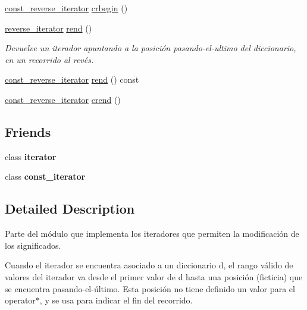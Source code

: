 \begin{Indent}
\begin{DoxyCompactItemize}
\hyperlink{classaed2_1_1iterator_a657402896e5b5966660032f5686cc4c4}{const\+\_\+reverse\+\_\+iterator} \hyperlink{classaed2_1_1iterator_aa4b6ce667258581859351db42cfd3ee4}{crbegin} ()
\item 
\hyperlink{classaed2_1_1iterator_a07b2c0fa31611e03cd019b290acd6d80}{reverse\+\_\+iterator} \hyperlink{classaed2_1_1iterator_a0007a7962bc6aca8dca78c2a49bd581d}{rend} ()
\begin{DoxyCompactList}\small\item\em Devuelve un iterador apuntando a la posición pasando-\/el-\/ultimo del diccionario, en un recorrido al revés. \end{DoxyCompactList}\item 
\hyperlink{classaed2_1_1iterator_a657402896e5b5966660032f5686cc4c4}{const\+\_\+reverse\+\_\+iterator} \hyperlink{classaed2_1_1iterator_ad7d43d936bf4f3957f590723e9029132}{rend} () const
\item 
\hyperlink{classaed2_1_1iterator_a657402896e5b5966660032f5686cc4c4}{const\+\_\+reverse\+\_\+iterator} \hyperlink{classaed2_1_1iterator_a2e31ad7ded06c666c6c37c5d30bb41af}{crend} ()
\end{DoxyCompactItemize}
\end{Indent}
\subsection*{Friends}
\begin{DoxyCompactItemize}
\item 
\mbox{\label{classaed2_1_1iterator_a67171474c4da6cc8efe0c7fafefd2b2d}} 
class {\bfseries iterator}
\item 
\mbox{\label{classaed2_1_1iterator_ac220ce1c155db1ac44146c12d178056f}} 
class {\bfseries const\+\_\+iterator}
\end{DoxyCompactItemize}


\subsection{Detailed Description}
Parte del módulo que implementa los iteradores que permiten la modificación de los significados. 

Cuando el iterador se encuentra asociado a un diccionario {\ttfamily d}, el rango válido de valores del iterador va desde el primer valor de {\ttfamily d} hasta una posición (ficticia) que se encuentra pasando-\/el-\/último. Esta posición no tiene definido un valor para el {\ttfamily operator$\ast$}, y se usa para indicar el fin del recorrido.

